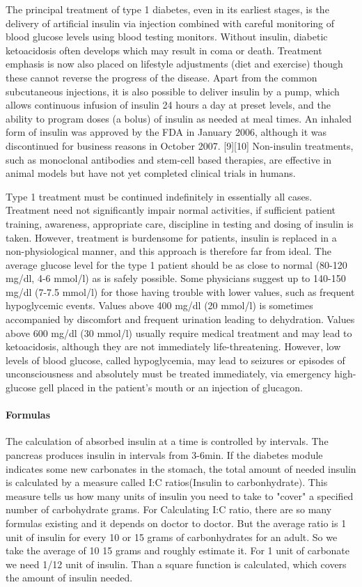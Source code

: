 The principal treatment of type 1 diabetes, even in its earliest stages, is the delivery of artificial insulin via injection combined with careful monitoring of blood glucose levels using blood testing monitors. 
Without insulin, diabetic ketoacidosis often develops which may result in coma or death. Treatment emphasis is now also placed on lifestyle adjustments (diet and exercise) though these cannot reverse the progress of the disease. 
Apart from the common subcutaneous injections, it is also possible to deliver insulin by a pump, which allows continuous infusion of insulin 24 hours a day at preset levels, and the ability to program doses (a bolus) of insulin as needed at meal times. 
An inhaled form of insulin was approved by the FDA in January 2006, although it was discontinued for business reasons in October 2007. [9][10] Non-insulin treatments, such as monoclonal antibodies and stem-cell based therapies, 
are effective in animal models but have not yet completed clinical trials in humans.

Type 1 treatment must be continued indefinitely in essentially all cases. Treatment need not significantly impair normal activities, if sufficient patient training, awareness, appropriate care, discipline in testing and dosing of insulin is taken. 
However, treatment is burdensome for patients, insulin is replaced in a
non-physiological manner, and this approach is therefore far from ideal. The
average glucose level for the type 1 patient should be as close to normal
(80-120 mg/dl, 4-6 mmol/l) as is safely possible. Some physicians suggest up to
140-150 mg/dl (7-7.5 mmol/l) for those having trouble with lower values, such
as frequent hypoglycemic events. Values above 400 mg/dl (20 mmol/l) is
sometimes accompanied by discomfort and frequent urination leading to
dehydration. Values above 600 mg/dl (30 mmol/l) usually require medical
treatment and may lead to ketoacidosis, although they are not immediately
life-threatening. However, low levels of blood glucose, called hypoglycemia,
may lead to seizures or episodes of unconsciousness and absolutely must be
treated immediately, via emergency high-glucose gell placed in the patient's
mouth or an injection of glucagon.

\paragraph{Formulas}
The calculation of absorbed insulin at a time is controlled by intervals. The pancreas produces insulin in intervals from 3-6min.
If the diabetes module indicates some new carbonates in the stomach, the total amount of needed insulin is calculated by a measure called I:C ratios(Insulin to carbonhydrate). This measure tells us how many units of insulin you need to take to "cover" a specified number of carbohydrate grams. For Calculating I:C ratio, there are so many formulas existing and it depends on doctor to doctor. But the average ratio is 1 unit of insulin for every 10 or 15 grams of carbonhydrates for an adult. So we take the average of 10 15 grams and roughly estimate it.
For 1 unit of carbonate we need 1/12 unit of insulin. Than a square function is calculated, which covers the amount of insulin needed.

